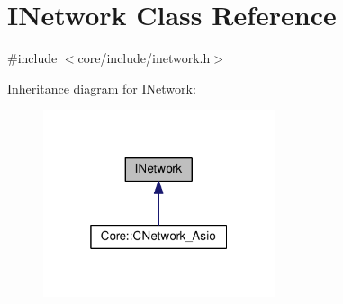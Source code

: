 \hypertarget{classINetwork}{}\section{I\+Network Class Reference}
\label{classINetwork}


{\ttfamily \#include $<$core/include/inetwork.\+h$>$}



Inheritance diagram for I\+Network\+:\nopagebreak
\begin{figure}[H]
\begin{center}
\leavevmode
\includegraphics[width=193pt]{classINetwork__inherit__graph}
\end{center}
\end{figure}
